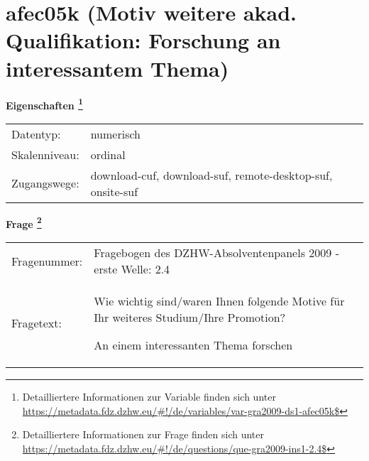 
    \setcounter{footnote}{0}

    \vspace*{-1.8cm}
	\section{afec05k (Motiv weitere akad. Qualifikation: Forschung an interessantem Thema)}
	\label{section:afec05k}



    \vspace*{0.5cm}
    \noindent\textbf{Eigenschaften
	\footnote{Detailliertere Informationen zur Variable finden sich unter
		\url{https://metadata.fdz.dzhw.eu/\#!/de/variables/var-gra2009-ds1-afec05k$}}}\\
	\begin{tabularx}{\hsize}{@{}lX}
	Datentyp: & numerisch \\
	Skalenniveau: & ordinal \\
	Zugangswege: &
	  download-cuf, 
	  download-suf, 
	  remote-desktop-suf, 
	  onsite-suf
 \\
    \end{tabularx}



				\vspace*{0.5cm}
                \noindent\textbf{Frage
	                \footnote{Detailliertere Informationen zur Frage finden sich unter
		              \url{https://metadata.fdz.dzhw.eu/\#!/de/questions/que-gra2009-ins1-2.4$}}}\\
				\begin{tabularx}{\hsize}{@{}lX}
					Fragenummer: &
					  Fragebogen des DZHW-Absolventenpanels 2009 - erste Welle:
					  2.4
 \\
					Fragetext: & Wie wichtig sind/waren Ihnen folgende Motive für Ihr weiteres Studium/Ihre Promotion?\par  An einem interessanten Thema forschen \\
				\end{tabularx}





